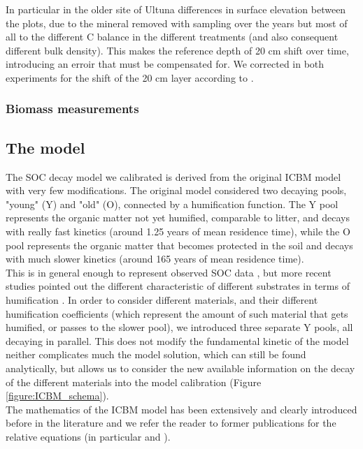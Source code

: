 \documentclass[review]{elsarticle}
\begin{document}
In particular in the older site of Ultuna differences in surface elevation between the plots, due to the mineral removed with sampling over the years but most of all to the different C balance in the different treatments (and also consequent different bulk density). This makes the reference depth of 20 cm shift over time, introducing an erroir that must be compensated for. We corrected in both experiments for the shift of the 20 cm layer according to \cite{Katterer2011}.


\subsubsection{Biomass measurements}





\subsection{The model}
The SOC decay model we calibrated is derived from the original ICBM model \cite{Andren1997} with very few modifications.
The original model \cite{Andren1997} considered two decaying pools, "young" (Y) and "old" (O), connected by a humification function. The Y pool represents the organic matter not yet humified, comparable to litter, and decays with really fast kinetics (around 1.25 years of mean residence time), while the O pool represents the organic matter that becomes protected in the soil and decays with much slower kinetics  (around 165 years of mean residence time).\\
This is in general enough to represent observed SOC data \cite{Andren2004}, but more recent studies pointed out the different characteristic of different substrates in terms of humification \cite{Katterer2011}. In order to consider different materials, and their different humification coefficients (which represent the amount of such material that gets humified, or passes to the slower pool), we introduced three separate Y pools, all decaying in parallel. This does not modify the fundamental kinetic of the model neither complicates much the model solution, which can still be found analytically, but allows us to consider the new available information on the decay of the different materials\cite{Katterer2011} into the model calibration (Figure \ref{figure:ICBM_schema}).\\
The mathematics of the ICBM model has been extensively and clearly introduced before in the literature and we refer the reader to former publications for the relative equations (in particular \cite{Katterer2011} and \cite{Katterer2001}).
\end{document}
